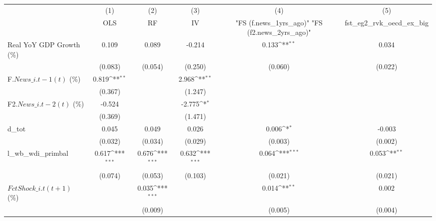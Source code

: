 {
\def\sym#1{\ifmmode^{#1}\else\(^{#1}\)\fi}
\begin{tabular}{l*{5}{c}}
\toprule
                    &\multicolumn{1}{c}{(1)}&\multicolumn{1}{c}{(2)}&\multicolumn{1}{c}{(3)}&\multicolumn{1}{c}{(4)}&\multicolumn{1}{c}{(5)}\\
                    &\multicolumn{1}{c}{OLS}&\multicolumn{1}{c}{RF}&\multicolumn{1}{c}{IV}&\multicolumn{1}{c}{ "FS (f.news\_1yrs\_ago)"  "FS (f2.news\_2yrs\_ago)" }&\multicolumn{1}{c}{fst\_eg2\_rvk\_oecd\_ex\_big}\\
\midrule
Real YoY GDP Growth (\%)&       0.109         &       0.089         &      -0.214         &       0.133\sym{**} &       0.034         \\
                    &     (0.083)         &     (0.054)         &     (0.250)         &     (0.060)         &     (0.022)         \\
\addlinespace
F.$ News\_{i.t-1}(t)$ (\%)&       0.819\sym{**} &                     &       2.968\sym{**} &                     &                     \\
                    &     (0.367)         &                     &     (1.247)         &                     &                     \\
\addlinespace
F2.$ News\_{i.t-2}(t)$ (\%)&      -0.524         &                     &      -2.775\sym{*}  &                     &                     \\
                    &     (0.369)         &                     &     (1.471)         &                     &                     \\
\addlinespace
d\_tot               &       0.045         &       0.049         &       0.026         &       0.006\sym{*}  &      -0.003         \\
                    &     (0.032)         &     (0.034)         &     (0.029)         &     (0.003)         &     (0.002)         \\
\addlinespace
l\_wb\_wdi\_primbal    &       0.617\sym{***}&       0.676\sym{***}&       0.632\sym{***}&       0.064\sym{***}&       0.053\sym{**} \\
                    &     (0.074)         &     (0.053)         &     (0.103)         &     (0.021)         &     (0.021)         \\
\addlinespace
$ FctShock\_{i.t}(t+1)$ (\%)&                     &       0.035\sym{***}&                     &       0.014\sym{**} &       0.002         \\
                    &                     &     (0.009)         &                     &     (0.005)         &     (0.004)         \\

\end{tabular}}
